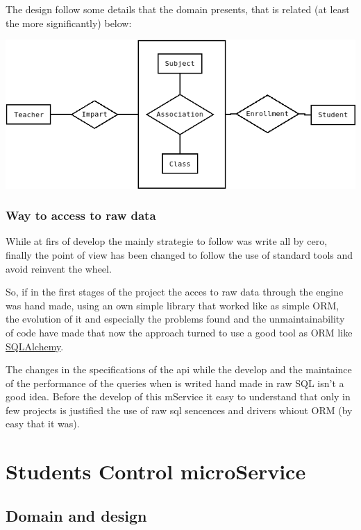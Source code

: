 The design follow some details that the domain presents, that is related
(at least the more significantly) below:

\begin{center}
\includegraphics[scale=0.4]{img/diagrams/dbms-ER.png}
\end{center}



\subsubsection{Way to access to raw data}

While at firs of develop the mainly strategie to follow was write
all by cero, finally the point of view has been changed to follow
the use of standard tools and avoid reinvent the wheel.

So, if in the first stages of the project the acces to raw data through
the engine was hand made, using an own simple library that worked
like as simple ORM, the evolution of it and especially the problems
found and the unmaintainability of code have made that now the approach
turned to use a good tool as ORM like \href{http://www.google.es}{SQLAlchemy}.

The changes in the specifications of the api while the develop and
the maintaince of the performance of the queries when is writed hand
made in raw SQL isn't a good idea. Before the develop of this mService
it easy to understand that only in few projects is justified the use
of raw sql sencences and drivers whiout ORM (by easy that it was).


\section{Students Control microService}

\subsection{Domain and design}

